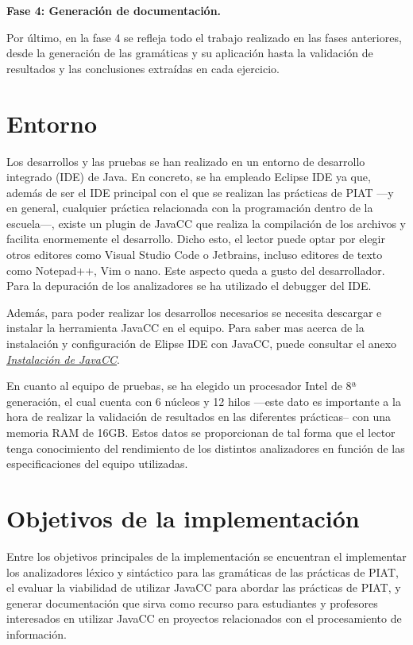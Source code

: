 \phantom{text}

\noindent \textbf{Fase 4: Generación de documentación.}

\phantom{text}

\noindent Por último, en la fase 4 se refleja todo el trabajo realizado en las fases anteriores, desde la generación de las gramáticas y su aplicación hasta la validación de resultados y las conclusiones extraídas en cada ejercicio.


\section{Entorno}
\noindent Los desarrollos y las pruebas se han realizado en un entorno de desarrollo integrado (IDE) de Java. En concreto, se ha empleado Eclipse IDE ya que, además de ser el IDE principal con el que se realizan las prácticas de PIAT ---y en general, cualquier práctica relacionada con la programación dentro de la escuela---, existe un plugin de JavaCC que realiza la compilación de los archivos y facilita enormemente el desarrollo. Dicho esto, el lector puede optar por elegir otros editores como Visual Studio Code o Jetbrains, incluso editores de texto como Notepad++, Vim o  nano. Este aspecto queda a gusto del desarrollador. Para la depuración de los analizadores se ha utilizado el debugger del IDE.

Además, para poder realizar los desarrollos necesarios se necesita descargar e instalar la herramienta JavaCC en el equipo. Para saber mas acerca de la instalación y configuración de Elipse IDE con JavaCC, puede consultar el anexo \hyperref[sec:instalaciondejavacc]{\textit{Instalación de JavaCC}}.

En cuanto al equipo de pruebas, se ha elegido un procesador Intel de 8ª generación, el cual cuenta con 6 núcleos y 12 hilos ---este dato es importante a la hora de realizar la validación de resultados en las diferentes prácticas-- con una memoria RAM de 16GB. Estos datos se proporcionan de tal forma que el lector tenga conocimiento del rendimiento de los distintos analizadores en función de  las especificaciones del equipo utilizadas.

\section{Objetivos de la implementación}
\noindent Entre los objetivos principales de la implementación se encuentran el implementar los analizadores léxico y sintáctico para las gramáticas de las prácticas de PIAT, el evaluar la viabilidad de utilizar JavaCC para abordar las prácticas de PIAT, y generar documentación que sirva como recurso para estudiantes y profesores interesados en utilizar JavaCC en proyectos relacionados con el procesamiento de información.

